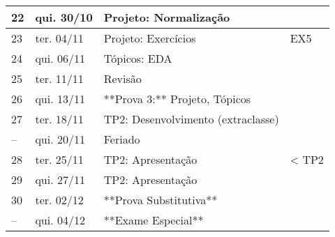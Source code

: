 \documentclass[12pt, a4paper]{article}
\begin{document}
\begin{table}[!ht]
\begin{tabular}{|l|l|l|l|}
        22 & qui. 30/10 & Projeto: Normalização & ~ \\ \hline
        23 & ter. 04/11 & Projeto: Exercícios & EX5 \\ \hline
        24 & qui. 06/11 & Tópicos: EDA & ~ \\ \hline
        25 & ter. 11/11 & Revisão & ~ \\ \hline
        26 & qui. 13/11 & **Prova 3:** Projeto, Tópicos & ~ \\ \hline
        27 & ter. 18/11 & TP2: Desenvolvimento (extraclasse) & ~ \\ \hline
        -- & qui. 20/11 & Feriado & ~ \\ \hline
        28 & ter. 25/11 & TP2: Apresentação & < TP2 \\ \hline
        29 & qui. 27/11 & TP2: Apresentação & ~ \\ \hline
        30 & ter. 02/12 & **Prova Substitutiva** & ~ \\ \hline
        -- & qui. 04/12 & **Exame Especial** & ~ \\ \hline
    \end{tabular}
\end{table}
\end{document}

